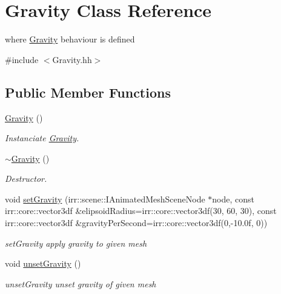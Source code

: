 \hypertarget{classGravity}{}\section{Gravity Class Reference}
\label{classGravity}


where \hyperlink{classGravity}{Gravity} behaviour is defined  




{\ttfamily \#include $<$Gravity.\+hh$>$}

\subsection*{Public Member Functions}
\begin{DoxyCompactItemize}
\item 
\mbox{\label{classGravity_ae971708aa344811adcc352e2d8a707de}} 
\hyperlink{classGravity_ae971708aa344811adcc352e2d8a707de}{Gravity} ()
\begin{DoxyCompactList}\small\item\em Instanciate \hyperlink{classGravity}{Gravity}. \end{DoxyCompactList}\item 
\mbox{\label{classGravity_a6fcaf5f5f0d4672c4a1d97a3102e053a}} 
\hyperlink{classGravity_a6fcaf5f5f0d4672c4a1d97a3102e053a}{$\sim$\+Gravity} ()
\begin{DoxyCompactList}\small\item\em Destructor. \end{DoxyCompactList}\item 
void \hyperlink{classGravity_adc8738cabe1e73c29697f7065d1273e0}{set\+Gravity} (irr\+::scene\+::\+I\+Animated\+Mesh\+Scene\+Node $\ast$node, const irr\+::core\+::vector3df \&elipsoid\+Radius=irr\+::core\+::vector3df(30, 60, 30), const irr\+::core\+::vector3df \&gravity\+Per\+Second=irr\+::core\+::vector3df(0,-\/10.\+0f, 0))
\begin{DoxyCompactList}\small\item\em set\+Gravity apply gravity to given mesh \end{DoxyCompactList}\item 
\mbox{\label{classGravity_a2e27a01c3edd1a5d8aa580dced3c92b8}} 
void \hyperlink{classGravity_a2e27a01c3edd1a5d8aa580dced3c92b8}{unset\+Gravity} ()
\begin{DoxyCompactList}\small\item\em unset\+Gravity unset gravity of given mesh \end{DoxyCompactList}\end{DoxyCompactItemize}



